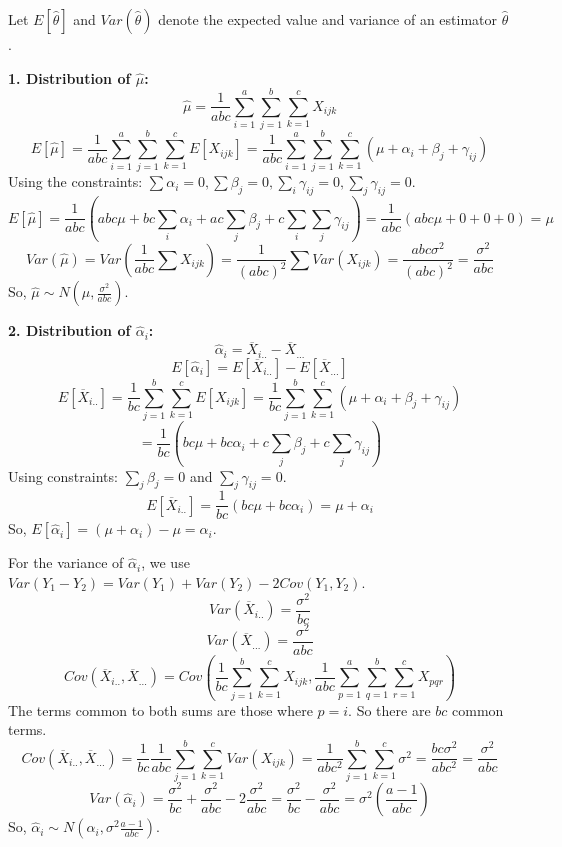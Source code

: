 Let $E[\widehat{\theta}]$ and $Var(\widehat{\theta})$ denote the expected value and variance of an estimator $\widehat{\theta}$.

\textbf{1. Distribution of $\widehat{\mu}$:}
\[
\widehat{\mu} = \frac{1}{abc} \sum_{i=1}^{a} \sum_{j=1}^{b} \sum_{k=1}^{c} X_{ijk}
\]
\[
E[\widehat{\mu}] = \frac{1}{abc} \sum_{i=1}^{a} \sum_{j=1}^{b} \sum_{k=1}^{c} E[X_{ijk}] = \frac{1}{abc} \sum_{i=1}^{a} \sum_{j=1}^{b} \sum_{k=1}^{c} (\mu + \alpha_i + \beta_j + \gamma_{ij})
\]
Using the constraints: $\sum \alpha_i = 0, \sum \beta_j = 0, \sum_i \gamma_{ij} = 0, \sum_j \gamma_{ij} = 0$.
\[
E[\widehat{\mu}] = \frac{1}{abc} (abc\mu + bc\sum_i\alpha_i + ac\sum_j\beta_j + c\sum_i\sum_j\gamma_{ij}) = \frac{1}{abc} (abc\mu + 0 + 0 + 0) = \mu
\]
\[
Var(\widehat{\mu}) = Var\left(\frac{1}{abc} \sum X_{ijk}\right) = \frac{1}{(abc)^2} \sum Var(X_{ijk}) = \frac{abc \sigma^2}{(abc)^2} = \frac{\sigma^2}{abc}
\]
So, $\widehat{\mu} \sim N\left(\mu, \frac{\sigma^2}{abc}\right)$.

\textbf{2. Distribution of $\widehat{\alpha}_i$:}
\[
\widehat{\alpha}_i = \overline{X}_{i..} - \overline{X}_{...}
\]
\[
E[\widehat{\alpha}_i] = E[\overline{X}_{i..}] - E[\overline{X}_{...}]
\]
\[
E[\overline{X}_{i..}] = \frac{1}{bc} \sum_{j=1}^{b} \sum_{k=1}^{c} E[X_{ijk}] = \frac{1}{bc} \sum_{j=1}^{b} \sum_{k=1}^{c} (\mu + \alpha_i + \beta_j + \gamma_{ij})
\]
\[
= \frac{1}{bc} (bc\mu + bc\alpha_i + c\sum_j\beta_j + c\sum_j\gamma_{ij})
\]
Using constraints: $\sum_j\beta_j = 0$ and $\sum_j\gamma_{ij} = 0$.
\[
E[\overline{X}_{i..}] = \frac{1}{bc} (bc\mu + bc\alpha_i) = \mu + \alpha_i
\]
So, $E[\widehat{\alpha}_i] = (\mu + \alpha_i) - \mu = \alpha_i$.

For the variance of $\widehat{\alpha}_i$, we use $Var(Y_1 - Y_2) = Var(Y_1) + Var(Y_2) - 2Cov(Y_1, Y_2)$.
\[
Var(\overline{X}_{i..}) = \frac{\sigma^2}{bc}
\]
\[
Var(\overline{X}_{...}) = \frac{\sigma^2}{abc}
\]
\[
Cov(\overline{X}_{i..}, \overline{X}_{...}) = Cov\left(\frac{1}{bc} \sum_{j=1}^{b}\sum_{k=1}^{c} X_{ijk}, \frac{1}{abc} \sum_{p=1}^{a}\sum_{q=1}^{b}\sum_{r=1}^{c} X_{pqr}\right)
\]
The terms common to both sums are those where $p=i$. So there are $bc$ common terms.
\[
Cov(\overline{X}_{i..}, \overline{X}_{...}) = \frac{1}{bc} \frac{1}{abc} \sum_{j=1}^{b}\sum_{k=1}^{c} Var(X_{ijk}) = \frac{1}{abc^2} \sum_{j=1}^{b}\sum_{k=1}^{c} \sigma^2 = \frac{bc\sigma^2}{abc^2} = \frac{\sigma^2}{abc}
\]
\[
Var(\widehat{\alpha}_i) = \frac{\sigma^2}{bc} + \frac{\sigma^2}{abc} - 2\frac{\sigma^2}{abc} = \frac{\sigma^2}{bc} - \frac{\sigma^2}{abc} = \sigma^2 \left(\frac{a-1}{abc}\right)
\]
So, $\widehat{\alpha}_i \sim N\left(\alpha_i, \sigma^2 \frac{a-1}{abc}\right)$.

